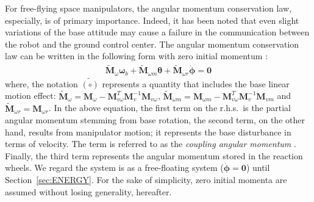 \documentclass[preprint,12pt]{elsarticle}
\def\sec#1{{Section~\ref{sec:#1}}}
\def\th{{\bbm{\theta}}}
\def\phd{{\dot{{\bbm{\phi}}}}}
\def\tbm#1{{\tilde{\bbm{#1}}}}
\def\bbm#1{\bm{#1}}
\begin{document}
For free-flying space manipulators,
the angular momentum conservation law, especially,
is of primary importance.
Indeed, it has been noted that even slight variations of the base attitude may cause a failure
in the communication between the robot and the ground control center.
The angular momentum conservation law can be written in the following form with zero initial momentum \cite{Dimitrov2004}:
%
\begin{align}
  \tbm{M}_{\omega}\bm{\omega}_{b} + \tbm{M}_{\omega m}\th + \tbm{M}_{\omega r}\phd = \bm{0}
\end{align}
%
where,
the notation $\tilde{(\circ)}$ represents a quantity that includes the base linear motion effect:
$\tbm{M}_{\omega} = \bm{M}_{\omega} - \bm{M}_{v\omega}^{T}\bm{M}_{v}^{-1}\bm{M}_{v\omega}$,
$\tbm{M}_{\omega m} = \bm{M}_{\omega m} - \bm{M}_{v\omega}^{T}\bm{M}_{v}^{-1}\bm{M}_{vm}$ and
$\tbm{M}_{\omega r} = \bm{M}_{\omega r}$.
In the above equation,
the first term on the r.h.s.\ is the partial angular momentum stemming from base rotation,
the second term, on the other hand, results from manipulator motion;
it represents the base disturbance in terms of velocity.
The term is referred to as the \textit{coupling angular momentum} \cite{Nenchev1999}.
Finally,
the third term represents the angular momentum stored in the reaction wheels.
We regard the system is as a free-floating system ($\phd = \bm{0}$) until \sec{ENERGY}.
For the sake of simplicity,
zero initial momenta are assumed without losing generality, hereafter.

\end{document}
